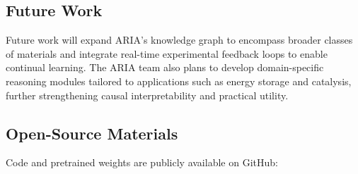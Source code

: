\subsection*{Future Work}

Future work will expand ARIA’s knowledge graph to encompass broader classes of materials and integrate real-time experimental feedback loops to enable continual learning. The ARIA team also plans to develop domain-specific reasoning modules tailored to applications such as energy storage and catalysis, further strengthening causal interpretability and practical utility.

\subsection*{Open-Source Materials}

Code and pretrained weights are publicly available on GitHub: 









